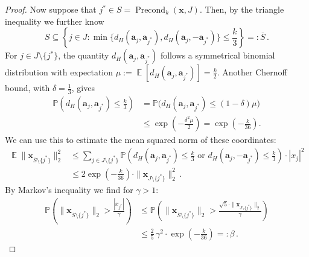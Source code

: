 \documentclass[10pt,a4paper]{amsart}
\renewcommand{\P}{{\mathbb P}}
\newcommand{\expect}{\operatorname{\mathbb{E}}}
\DeclareMathOperator{\precond}{Precond}
\renewcommand{\vec}{\boldsymbol}
\begin{document}
\begin{proof}
    Now suppose that $j^\ast \in S = \precond_k(\vec{x},J)$. Then, by the triangle inequality we further know
    \begin{equation*}
        S \subseteq \left\{ j \in J \colon \min\{d_H(\vec{a}_j,\vec{a}_{j^\ast}),d_H(\vec{a}_j,-\vec{a}_{j^\ast})\}
                \leq \frac{k}{3} \right\} =: \overline{S} \,.
    \end{equation*}
    For $j \in J \setminus\{j^\ast\}$, the quantity $d_H(\vec{a}_j,\vec{a}_{j^\ast})$ follows a symmetrical binomial distribution with expectation $\mu := \expect\left[d_H(\vec{a}_j,\vec{a}_{j^\ast})\right] = \frac{k}{2}$.
    Another Chernoff bound,
    with $\delta = \frac{1}{3}$,
    gives
    \begin{align*}
        \P\left(d_H(\vec{a}_j,\vec{a}_{j^\ast}) \leq \frac{k}{3}\right)
            &= \P\bigl(d_H(\vec{a}_j,\vec{a}_{j^\ast}) \leq (1-\delta) \mu\bigr) \\
            &\leq \exp\left(-\frac{\delta^2 \mu}{2}\right)
            = \exp\left(-\frac{k}{36}\right) .
    \end{align*}
    We can use this to estimate the mean squared norm of these coordinates:
    \begin{align*}
        \expect \|\vec{x}_{\overline{S} \setminus\{j^\ast\}}\|_2^2
            &\leq \sum_{j \in J \setminus\{j^\ast\}} \P\left(d_H(\vec{a}_j,\vec{a}_{j^\ast}) \leq \frac{k}{3} \text{ or } d_H(\vec{a}_j,-\vec{a}_{j^\ast}) \leq \frac{k}{3}\right) \cdot |x_j|^2 \\
            &\leq 2\exp\left(-\frac{k}{36}\right)
                \cdot \|\vec{x}_{J \setminus \{j^\ast\}}\|_2^2 \,.
    \end{align*}
    By Markov's inequality we find for $\gamma > 1$:
    \begin{align}
        \P\left( \|\vec{x}_{\overline{S} \setminus\{j^\ast\}}\|_2 > \frac{|x_{j^\ast}|}{\gamma}\right)
            &\leq \P\left( \|\vec{x}_{\overline{S} \setminus\{j^\ast\}}\|_2 
                    > \frac{\sqrt{5} \cdot \|\vec{x}_{J \setminus\{j^\ast\}}\|_2}{\gamma}\right)
            \nonumber \\
            &\leq \frac{2}{5} \, \gamma^2 \cdot \exp\left(-\frac{k}{36}\right) =: \beta\,.
            \label{eq:precondnorm}
    \end{align}


\end{proof}
\end{document}
